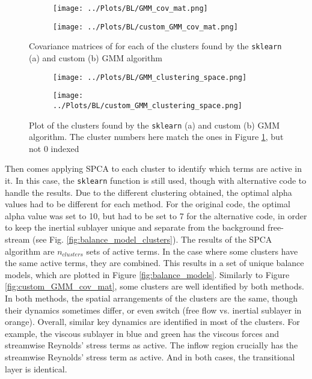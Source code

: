 \documentclass[12pt]{report} %
\begin{document}
\begin{figure}[htbp]
  \centering
  \begin{subfigure}[b]{0.7\textwidth}
      \texttt{[image: ../Plots/BL/GMM\_cov\_mat.png]}
      \caption{}
  \end{subfigure}
  \begin{subfigure}[b]{0.7\textwidth}
      \texttt{[image: ../Plots/BL/custom\_GMM\_cov\_mat.png]}
      \caption{}
  \end{subfigure}
  \caption{Covariance matrices of for each of the clusters found by the \texttt{sklearn} (a) and custom (b) GMM algorithm}
  \label{fig:GMM_cov_mat}
\end{figure}


\begin{figure}[htbp]
  \centering
  \begin{subfigure}[b]{0.7\textwidth}
      \texttt{[image: ../Plots/BL/GMM\_clustering\_space.png]}
      \caption{}
  \end{subfigure}
  \begin{subfigure}[b]{0.7\textwidth}
      \texttt{[image: ../Plots/BL/custom\_GMM\_clustering\_space.png]}
      \caption{}
  \end{subfigure}
  \caption{Plot of the clusters found by the \texttt{sklearn} (a) and custom (b) GMM algorithm. The cluster numbers here match the ones in Figure \ref{fig:GMM_cov_mat}, but not 0 indexed}
  \label{fig:GMM_clusters}
\end{figure}

\newpage

Then comes applying SPCA to each cluster to identify which terms are active in it. In this case, the \texttt{sklearn} function is still used, though with alternative code to handle the results. Due to the different clustering obtained, the optimal alpha values had to be different for each method. For the original code, the optimal alpha value was set to 10, but had to be set to 7 for the alternative code, in order to keep the inertial sublayer unique and separate from the background free-stream (see Fig. \ref{fig:balance_model_clusters}). The results of the SPCA algorithm are $n_{clusters}$  sets of active terms. In the case where some clusters have the same active terms, they are combined. This results in a set of unique balance models, which are plotted in Figure \ref{fig:balance_models}. Similarly to Figure \ref{fig:custom_GMM_cov_mat}, some clusters are well identified by both methods. In both methods, the spatial arrangements of the clusters are the same, though their dynamics sometimes differ, or even switch (free flow vs. inertial sublayer in orange). Overall, similar key dynamics are identified in most of the clusters. For example, the viscous sublayer in blue and green has the viscous forces and streamwise Reynolds’ stress terms as active. The inflow region crucially has the streamwise Reynolds’ stress term as active. And in both cases, the transitional layer is identical.
\end{document}

